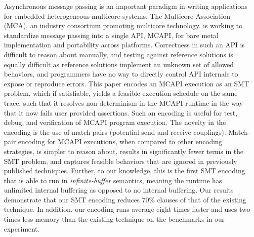 Asynchronous message passing is an important paradigm in writing
applications for embedded heterogeneous multicore systems.  The
Multicore Association (MCA), an industry consortium promoting
multicore technology, is working to standardize message passing into a
single API, MCAPI, for bare metal implementation and portability
across platforms.  Correctness in such an API is difficult to reason
about manually, and testing against reference solutions is equally
difficult as reference solutions implement an unknown set of allowed
behaviors, and programmers have no way to directly control API
internals to expose or reproduce errors.  This paper encodes an MCAPI
execution as an SMT problem, which if satisfiable, yields a feasible
execution schedule on the same trace,
such that it resolves non-determinism in the MCAPI runtime in the way that it now fails user provided assertions.
Such an encoding is useful for test, debug, and
verification of MCAPI program execution.  The novelty in the encoding
is the use of match pairs (potential send and receive couplings).  Match-pair encoding for
MCAPI executions, when compared to other encoding strategies, is
simpler to reason about, results in significantly fewer terms in the
SMT problem, and captures feasible behaviors that are ignored in
previously published techniques. Further, to our knowledge, this is the first SMT encoding  that is able to run in \textit{infinite-buffer} semantics, meaning the runtime has unlimited internal buffering as opposed to no internal buffering. %
Our results demonstrate that our SMT encoding reduces $70\%$ clauses of that of the existing technique. In addition, our encoding runs average eight times faster and uses two times less memory than the existing technique on the benchmarks in our experiment.

